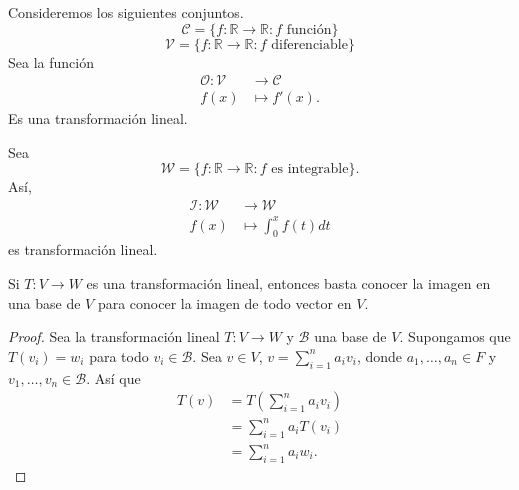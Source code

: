 \documentclass[12pt,a4paper]{book}
\newcommand{\llaves}[1]{\{#1\}}
\newcommand{\parentesis}[1]{\left(#1\right)}
\begin{document}
    \begin{ejemplo}
        Consideremos los siguientes conjuntos.
        \begin{equation*}
            \mathcal{C} = \llaves{f:\mathbb{R} \to \mathbb{R}: f \text{ función}}
        \end{equation*}
        \begin{equation*}
            \mathcal{V} = \llaves{f: \mathbb{R} \to \mathbb{R}:f \text{ diferenciable}}
        \end{equation*}
        Sea la función
        \begin{align*}
            \mathcal{O}:\mathcal{V} & \to \mathcal{C}\\
            f(x) & \mapsto f'(x).
        \end{align*}
        Es una transformación lineal.
    \end{ejemplo}

    \begin{ejemplo}
        Sea
        \begin{equation*}
            \mathcal{W} = \llaves{f:\mathbb{R} \to \mathbb{R}:f \text{ es integrable}}.
        \end{equation*}
        Así,
        \begin{align*}
            \mathcal{I}: \mathcal{W} & \to \mathcal{W}\\
            f(x) & \mapsto \int_{0}^xf(t)dt
        \end{align*}
        es transformación lineal.
    \end{ejemplo}

    \begin{proposicion}
        Si $T:V \to W$ es una transformación lineal, entonces basta conocer la imagen en una base
        de $V$ para conocer la imagen de todo vector en $V$.
    \end{proposicion}

    \begin{proof}
        Sea la transformación lineal $T:V \to W$ y $\mathcal{B}$ una base de $V$. Supongamos que $T(v_i) = w_i$ para todo $v_i \in \mathcal{B}$. Sea $v \in V$, $v = \sum_{i = 1}^na_iv_i$, donde $a_1, \dots, a_n \in F$ y $v_1, \dots, v_n \in \mathcal{B}$. Así que
        \begin{align*}
            T(v) & = T\parentesis{\sum_{i = 1}^na_iv_i}\\
            & = \sum_{i = 1}^na_iT(v_i)\\
            & = \sum_{i = 1}^na_iw_i.
        \end{align*}
    \end{proof}
\end{document}
